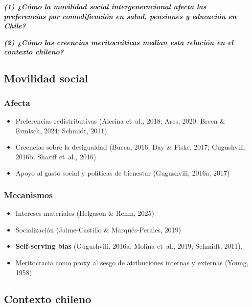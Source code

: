 \documentclass[
  spanish,
  letterpaper,
  DIV=11,
  numbers=noendperiod,
  oneside]{scrartcl}
\providecommand{\tightlist}{%
  \setlength{\itemsep}{0pt}\setlength{\parskip}{0pt}}
\begin{document}
\textbf{\emph{(1) ¿Cómo la movilidad social intergeneracional afecta las
preferencias por comodificación en salud, pensiones y educación en
Chile?}}

\textbf{\emph{(2) ¿Cómo las creencias meritocráticas median esta
relación en el contexto chileno?}}

\subsection{Movilidad social}\label{movilidad-social}

\subsubsection{Afecta}\label{afecta}

\begin{itemize}
\tightlist
\item
  Preferencias redistributivas (Alesina et~al., 2018; Ares, 2020; Breen
  \& Ermisch, 2024; Schmidt, 2011)
\item
  Creencias sobre la desigualdad (Bucca, 2016; Day \& Fiske, 2017;
  Gugushvili, 2016b; Shariff et~al., 2016)
\item
  Apoyo al gasto social y políticas de bienestar (Gugushvili, 2016a,
  2017)
\end{itemize}

\subsubsection{Mecanismos}\label{mecanismos}

\begin{itemize}
\tightlist
\item
  Intereses materiales (Helgason \& Rehm, 2025)
\item
  Socialización (Jaime-Castillo \& Marqués-Perales, 2019)
\item
  \textbf{Self-serving bias} (Gugushvili, 2016a; Molina et~al., 2019;
  Schmidt, 2011).
\item
  Meritocracia como proxy al sesgo de atribuciones internas y externas
  (Young, 1958)
\end{itemize}

\subsection{Contexto chileno}\label{contexto-chileno}
\end{document}
